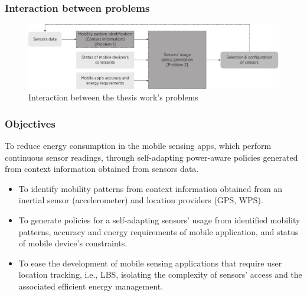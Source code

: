 \documentclass[compress,9pt,xcolor={dvipsnames,table}]{beamer}
\begin{document}
\begin{frame}\frametitle{Interaction between problems}
\begin{figure}[tb]
  \centering
  \includegraphics[width=\textwidth]{../../../resources/images/vectors/problems-incorporation}
  \caption{Interaction between the thesis work's problems}
  \label{fig:probems-incorporation}
\end{figure}
\end{frame}

\begin{frame}\frametitle{Objectives}
\begin{tcolorbox}[title=Main objective,colframe=PineGreen]
To reduce energy consumption in the mobile sensing apps, which perform continuous sensor readings, through self-adapting power-aware policies generated from context information obtained from sensors data.
\end{tcolorbox}

\pause

\begin{tcolorbox}[title=Particular objectives,colframe=PineGreen]
\small
\begin{itemize}
  \item To identify mobility patterns from context information obtained from an inertial sensor (accelerometer) and location providers (GPS, WPS).
  \item To generate policies for a self-adapting sensors' usage from identified mobility patterns, accuracy and energy requirements of mobile application, and status of mobile device's constraints. 
  \item To ease the development of mobile sensing applications that require user location tracking, i.e., LBS, isolating the complexity of sensors' access and the associated efficient energy management.
\end{itemize}
\end{tcolorbox}
\end{frame}
\end{document}
